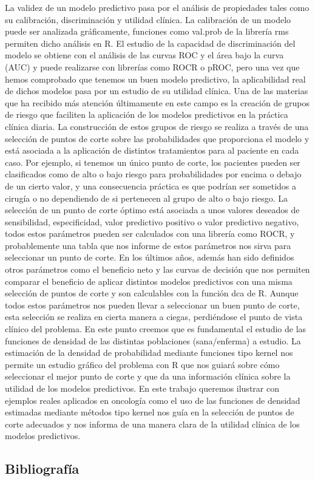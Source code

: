 La validez de un modelo predictivo pasa por el análisis de propiedades tales como su calibración, discriminación y utilidad clínica. 
La calibración de un modelo puede ser analizada gráficamente, funciones como val.prob  de la librería rms permiten dicho análisis en R. El estudio de la capacidad de discriminación del modelo se obtiene con el análisis de las curvas ROC y el área bajo la curva (AUC)  y puede realizarse con  librerías como ROCR o pROC, pero una vez que hemos comprobado que tenemos un buen modelo predictivo, la aplicabilidad real de dichos modelos pasa por un estudio de su utilidad clínica.
Una de las materias que ha recibido más atención últimamente en este campo es la creación de grupos de riesgo que faciliten la aplicación de los modelos predictivos  en la práctica clínica diaria. La construcción de estos grupos de riesgo se realiza a través de una selección de puntos de corte sobre las probabilidades que proporciona el modelo y está asociada a la aplicación de distintos tratamientos para al paciente en cada caso. Por ejemplo, si tenemos un único punto de corte, los pacientes pueden ser clasificados como de alto o bajo riesgo para probabilidades por encima o debajo de un cierto valor, y una consecuencia práctica es que podrían ser sometidos a cirugía o no dependiendo de si pertenecen al grupo de alto o bajo riesgo.  
La selección de un punto de corte óptimo está asociada a unos valores deseados de sensibilidad, especificidad, valor predictivo positivo o valor predictivo negativo, todos estos parámetros pueden ser calculados con una librería como ROCR, y probablemente una tabla que nos informe de estos parámetros nos sirva para seleccionar un punto de corte.  En los últimos años, además han sido definidos otros parámetros como  el beneficio neto y las curvas de decisión que nos permiten comparar el beneficio de aplicar distintos modelos predictivos con una misma selección de puntos de corte y son calculables con la función dca de R.
Aunque todos estos parámetros nos pueden llevar a seleccionar un buen punto de corte, esta selección se realiza en cierta manera a ciegas, perdiéndose el punto de vista clínico del problema. En este punto creemos que es fundamental el estudio de las funciones de densidad de las distintas poblaciones (sana/enferma) a estudio. La estimación de la densidad de probabilidad mediante funciones tipo kernel nos permite  un estudio gráfico del problema con R que nos guiará sobre cómo seleccionar el mejor punto de corte y que da una información clínica sobre la utilidad de los modelos predictivos.  
En este trabajo  queremos ilustrar con ejemplos reales aplicados en oncología como el uso de las funciones de densidad estimadas mediante métodos tipo kernel nos guía en la selección de puntos de corte adecuados y nos informa de una manera clara de la utilidad clínica de los modelos predictivos. \bigskip\subsection*{Bibliografía}


